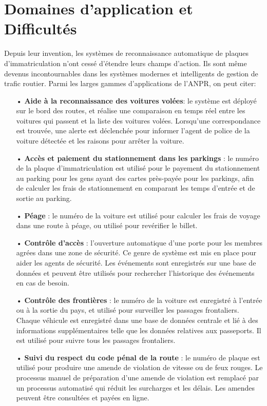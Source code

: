 \section{Domaines d'application et Difficultés}
Depuis leur invention, les systèmes de reconnaissance automatique de plaques d’immatriculation n’ont cessé d’étendre leurs champs d’action. Ils sont même devenus incontournables dans les systèmes modernes et intelligents de gestion de trafic routier. Parmi les larges gammes d’applications de l’ANPR, on peut citer: 
    \begin{itemize}
        \item[•]\textbf{Aide à la reconnaissance des voitures volées}: le système est déployé sur le bord des routes, et réalise une comparaison en temps réel entre les voitures qui passent et la liste des voitures volées. Lorsqu’une correspondance est trouvée, une alerte est déclenchée pour informer l’agent de police de la voiture détectée et les raisons pour arrêter la voiture.
        \item[•]\textbf{Accès et paiement du stationnement dans les parkings} : le numéro de la plaque d’immatriculation est utilisé pour le payement du stationnement au parking pour les gens ayant des cartes près-payée pour les parkings, afin de calculer les frais de stationnement en comparant les temps d’entrée et de sortie au parking.
        \item[•]\textbf{Péage} : le numéro de la voiture est utilisé pour calculer les frais de voyage dans une route à péage, ou utilisé pour revérifier le billet.
        \item[•]\textbf{Contrôle d’accès} : l’ouverture automatique d’une porte pour les membres agrées dans une zone de sécurité. Ce genre de système est mis en place pour aider les agents de sécurité. Les événements sont enregistrés sur une base de données et peuvent être utilisés pour rechercher l’historique des événements en cas de besoin.
        \item[•]\textbf{Contrôle des frontières} : le numéro de la voiture est enregistré à l’entrée ou à la sortie du pays, et utilisé pour surveiller les passages frontaliers. Chaque véhicule est enregistré dans une base de données centrale et lié à des informations supplémentaires telle que les données relatives aux passeports. Il est utilisé pour suivre tous les passages frontaliers.
        \item[•]\textbf{Suivi du respect du code pénal de la route} : le numéro de plaque est utilisé pour produire une amende de violation de vitesse ou de feux rouges. Le processus manuel de préparation d’une amende de violation
        est remplacé par un processus automatisé qui réduit les surcharges et les délais. Les amendes peuvent être consultées et payées en ligne. \cite{HindeThesis}         
    \end{itemize} \par

